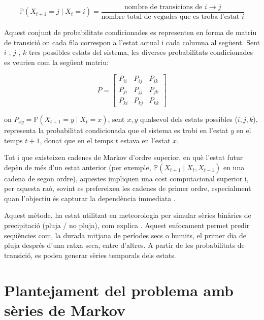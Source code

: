 \documentclass[../main.tex]{subfiles}
\begin{document}
\begin{equation}
    \mathbb{P}(X_{t+1} = j \mid X_t = i) = \frac{\text{nombre de transicions de } i \rightarrow j}{\text{nombre total de vegades que es troba l’estat } i}
    \label{calcul prob transició concreta}
\end{equation}



Aquest conjunt de probabilitats condicionades es representen en forma de matriu de transició on cada fila correspon a l'estat actual i cada columna al següent. Sent $i$ , $j$ , $k$  tres possibles estats del sistema, les diverses probabilitats condicionades es veurien com la següent matriu:

\begin{equation}
P =
\begin{bmatrix}
P_{ii} & P_{ij} & P_{ik} \\
P_{ji} & P_{jj} & P_{jk} \\
P_{ki} & P_{kj} & P_{kk}
\end{bmatrix}
\label{eq: def matriu transició}
\end{equation}


on $P_{xy} = \mathbb{P}(X_{t+1} = y \mid X_t = x)$, sent $x,y$ qualsevol dels estats possibles ($i,j,k$), representa la probabilitat condicionada que el sistema es trobi en l’estat $y$ en el temps $t+1$, donat que en el temps $t$ estava en l’estat $x$.

Tot i que existeixen cadenes de Markov d’ordre superior, en què l’estat futur depèn de més d’un estat anterior (per exemple, $\mathbb{P}(X_{t+1} \mid X_t, X_{t-1})$ en una cadena de segon ordre), aquestes impliquen una cost computacional superior i, per aquesta raó, sovint es prefereixen les cadenes de primer ordre, especialment quan l’objectiu és capturar la dependència immediata \parencite{inm2004}.

Aquest mètode, ha estat utilitzat en meteorologia per simular sèries binàries de precipitació (pluja / no pluja), com explica \textcite{inm2004}. Aquest enfocament permet predir seqüències com, la durada mitjana de períodes secs o humits, el primer dia de pluja després d'una ratxa seca, entre d'altres. A partir de les probabilitats de transició, es poden generar sèries temporals dels estats. 


\section{Plantejament del problema amb sèries de Markov}
\end{document}
